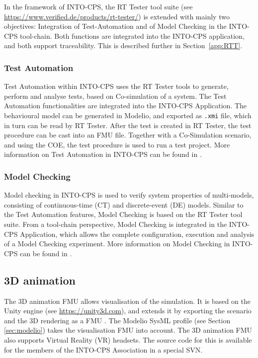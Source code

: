 In the framework of INTO-CPS, the RT Tester tool suite (see \url{https://www.verified.de/products/rt-tester/}) is extended with mainly two objectives: Integration of Test-Automation and of Model Checking in the INTO-CPS tool-chain. Both functions are integrated into the INTO-CPS application, and both support traceability. This is described further in Section~\ref{app:RTT}.

\subsubsection{Test Automation}

Test Automation within INTO-CPS uses the RT Tester tools to generate, perform and analyse tests, based on Co-simulation of a system. The Test Automation functionalities are integrated into the INTO-CPS Application. The behavioural model can be generated in Modelio, and exported as \texttt{.xmi} file, which in turn can be read by RT Tester. After the test is created in RT Tester, the test procedure can be cast into an FMU file. Together with a Co-Simulation scenario, and using the COE, the test procedure is used to run a test project. More information on Test Automation in INTO-CPS can be found in \cite{INTOCPSD5.3b}.

\subsubsection{Model Checking}

Model checking in INTO-CPS is used to verify system properties of multi-models, consisting of continuous-time (CT) and discrete-event (DE) models. Similar to the Test Automation features, Model Checking is based on the RT Tester tool suite. From a tool-chain perspective, Model Checking is integrated in the INTO-CPS Application, which allows the complete configuration, execution and analysis of a Model Checking experiment. More information on Model Checking in INTO-CPS can be found in \cite{INTOCPSD5.3c}.


\subsection{3D animation}

The 3D animation FMU allows visualisation of the simulation. It is based on the Unity engine (see \url{https://unity3d.com}), and extends it by exporting the scenario and the 3D rendering as a FMU \cite{Foldager&17}. The Modelio SysML profile (see Section \ref{sec:modelio}) takes the visualisation FMU into account. The 3D animation FMU also supports Virtual Reality (VR) headsets. The source code for this is available for the members of the INTO-CPS Association in a special SVN.

